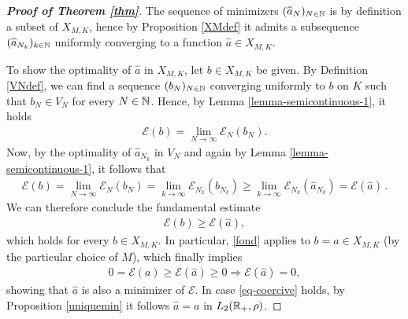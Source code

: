 \begin{proof}[\normalfont\bf Proof of Theorem \ref{thm}]
	The sequence of minimizers $(\widehat a_N)_{N \in \mathbb{N}}$ is by definition a subset of $X_{M,K}$, hence by Proposition \ref{XMdef} it admits a subsequence $(\widehat a_{N_k})_{k \in \mathbb{N}}$ uniformly converging to a function $\widehat a \in X_{M,K}$.
	
	To show the optimality of $\widehat a$ in $X_{M,K}$, let $b\in X_{M,K}$ be given. By Definition \ref{VNdef}, we can find a sequence $(b_N)_{N \in \mathbb{N}}$ converging uniformly to $b$ on $K$ such that $b_N\in V_N$ for every $N\in \mathbb{N}$. Hence, by Lemma \ref{lemma-semicontinuous-1}, it holds
	\begin{align*}
		\mathcal E(b)=\lim_{N\rightarrow\infty} \mathcal E_{N}(b_{N}).
	\end{align*}
	Now, by the optimality of $\widehat a_{N_k}$ in $V_N$ and again by Lemma \ref{lemma-semicontinuous-1}, it follows that
	\begin{align*}
		\mathcal E(b)=\lim_{N\rightarrow\infty}\mathcal E_N(b_N)
			= \lim_{k \rightarrow\infty}\mathcal E_{N_k}(b_{N_k})
			\geq\lim_{k \rightarrow\infty}\mathcal E_{N_k}(\widehat a_{N_k})
			= \mathcal E(\widehat a)\,.
	\end{align*}
	We can therefore conclude the fundamental estimate
	\begin{align}\label{fond}
		\mathcal E(b)\geq \mathcal E(\widehat a),
	\end{align}
	which holds for every $b \in X_{M,K}$. In particular, \eqref{fond} applies to $b=a\in X_{M,K}$ (by the particular choice of $M$), which finally implies
	\begin{align*}
		0=\mathcal E(a)\geq \mathcal E(\widehat a)\geq 0\Longrightarrow \mathcal  E(\widehat a)=0,
	\end{align*}
	showing that $\widehat a$ is also a minimizer of $\mathcal E$. In case \eqref{eq-coercive} holds, by Proposition \ref{uniquemin} it follows $\widehat a=a$ in  $L_2(\mathbb{R}_+,\rho)$.
\end{proof}